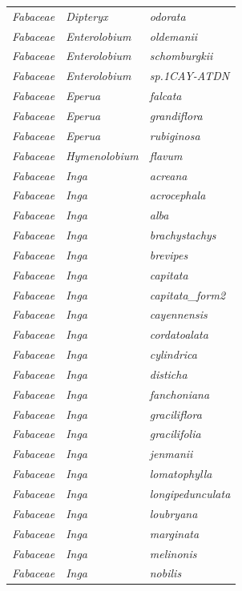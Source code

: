 \documentclass[fleqn,10pt]{ArtEcoFoG} %
\begin{document}
\begin{table}[t]
\begin{tabular}{lll}
\em{Fabaceae} & \em{Dipteryx} & \em{odorata}\\
\em{Fabaceae} & \em{Enterolobium} & \em{oldemanii}\\
\em{Fabaceae} & \em{Enterolobium} & \em{schomburgkii}\\
\em{Fabaceae} & \em{Enterolobium} & \em{sp.1CAY-ATDN}\\
\addlinespace
\em{Fabaceae} & \em{Eperua} & \em{falcata}\\
\em{Fabaceae} & \em{Eperua} & \em{grandiflora}\\
\em{Fabaceae} & \em{Eperua} & \em{rubiginosa}\\
\em{Fabaceae} & \em{Hymenolobium} & \em{flavum}\\
\em{Fabaceae} & \em{Inga} & \em{acreana}\\
\addlinespace
\em{Fabaceae} & \em{Inga} & \em{acrocephala}\\
\em{Fabaceae} & \em{Inga} & \em{alba}\\
\em{Fabaceae} & \em{Inga} & \em{brachystachys}\\
\em{Fabaceae} & \em{Inga} & \em{brevipes}\\
\em{Fabaceae} & \em{Inga} & \em{capitata}\\
\addlinespace
\em{Fabaceae} & \em{Inga} & \em{capitata\_form2}\\
\em{Fabaceae} & \em{Inga} & \em{cayennensis}\\
\em{Fabaceae} & \em{Inga} & \em{cordatoalata}\\
\em{Fabaceae} & \em{Inga} & \em{cylindrica}\\
\em{Fabaceae} & \em{Inga} & \em{disticha}\\
\addlinespace
\em{Fabaceae} & \em{Inga} & \em{fanchoniana}\\
\em{Fabaceae} & \em{Inga} & \em{graciliflora}\\
\em{Fabaceae} & \em{Inga} & \em{gracilifolia}\\
\em{Fabaceae} & \em{Inga} & \em{jenmanii}\\
\em{Fabaceae} & \em{Inga} & \em{lomatophylla}\\
\addlinespace
\em{Fabaceae} & \em{Inga} & \em{longipedunculata}\\
\em{Fabaceae} & \em{Inga} & \em{loubryana}\\
\em{Fabaceae} & \em{Inga} & \em{marginata}\\
\em{Fabaceae} & \em{Inga} & \em{melinonis}\\
\em{Fabaceae} & \em{Inga} & \em{nobilis}\\

\end{tabular}
\end{table}
\end{document}
